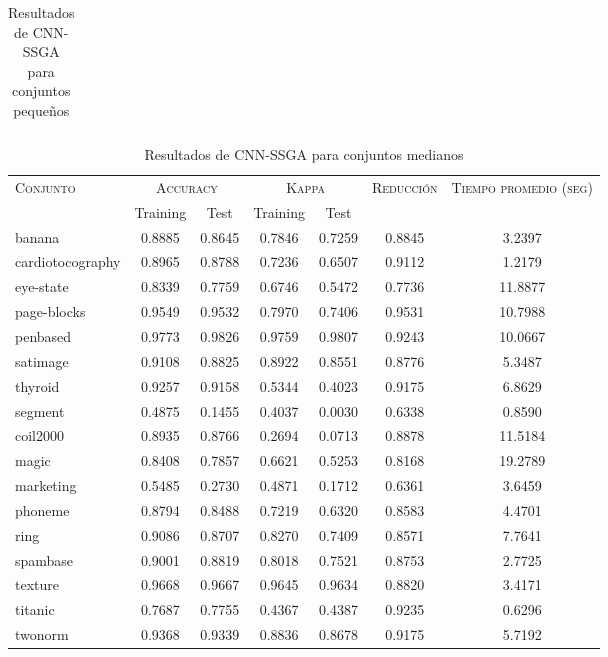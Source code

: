 \begin{table}[]
\begin{tabular}{l c c c c c c}
\hline
\end{tabular}
\caption{Resultados de CNN-SSGA para conjuntos pequeños }
\label{res-peq-cnn-ssga}
\end{table}


\begin{table}[]
\centering
\begin{tabular}{l c c c c c c}
\hline
\multirow{2}{*}{\textsc{Conjunto}}
	& \multicolumn{2}{c}{\textsc{Accuracy}}
	& \multicolumn{2}{c}{\textsc{Kappa}}
	& \textsc{Reducción}
	& \textsc{Tiempo promedio (seg)} \\
	& Training & Test
	& Training & Test \\ 
\hline
\hline

banana & 0.8885 & 0.8645 & 0.7846 & 0.7259 & 0.8845 & 3.2397 \\
cardiotocography & 0.8965 & 0.8788 & 0.7236 & 0.6507 & 0.9112 & 1.2179 \\
eye-state & 0.8339 & 0.7759 & 0.6746 & 0.5472 & 0.7736 & 11.8877 \\
page-blocks & 0.9549 & 0.9532 & 0.7970 & 0.7406 & 0.9531 & 10.7988 \\
penbased & 0.9773 & 0.9826 & 0.9759 & 0.9807 & 0.9243 & 10.0667 \\
satimage & 0.9108 & 0.8825 & 0.8922 & 0.8551 & 0.8776 & 5.3487 \\
thyroid & 0.9257 & 0.9158 & 0.5344 & 0.4023 & 0.9175 & 6.8629 \\
segment & 0.4875 & 0.1455 & 0.4037 & 0.0030 & 0.6338 & 0.8590 \\
coil2000 & 0.8935 & 0.8766 & 0.2694 & 0.0713 & 0.8878 & 11.5184 \\
magic & 0.8408 & 0.7857 & 0.6621 & 0.5253 & 0.8168 & 19.2789 \\
marketing & 0.5485 & 0.2730 & 0.4871 & 0.1712 & 0.6361 & 3.6459 \\
phoneme & 0.8794 & 0.8488 & 0.7219 & 0.6320 & 0.8583 & 4.4701 \\
ring & 0.9086 & 0.8707 & 0.8270 & 0.7409 & 0.8571 & 7.7641 \\
spambase & 0.9001 & 0.8819 & 0.8018 & 0.7521 & 0.8753 & 2.7725 \\
texture & 0.9668 & 0.9667 & 0.9645 & 0.9634 & 0.8820 & 3.4171 \\
titanic & 0.7687 & 0.7755 & 0.4367 & 0.4387 & 0.9235 & 0.6296 \\
twonorm & 0.9368 & 0.9339 & 0.8836 & 0.8678 & 0.9175 & 5.7192 \\

\hline
\end{tabular}
\caption{Resultados de CNN-SSGA para conjuntos medianos }
\label{res-med-cnn-ssga}
\end{table}


